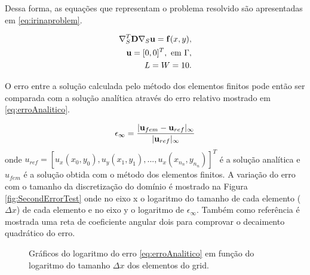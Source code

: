 Dessa forma, as equações que representam o problema resolvido são apresentadas em \eqref{eq:irinaproblem}. 

\begin{equation}\label{eq:irinaproblem}
    \begin{aligned}
        \nabla_S^T \mathbf{D} \nabla_S  \mathbf{u} = \mathbf{f}(x, y), \\
        \mathbf{u} = [0, 0]^T, \text{ em } \Gamma ,\\
        L = W = 10.
    \end{aligned}
\end{equation}

O erro entre a solução calculada pelo método dos elementos finitos pode então ser comparada
com a solução analítica através do erro relativo mostrado em \eqref{eq:erroAnalitico}.

\begin{equation} \label{eq:erroAnalitico}
    \epsilon_{\infty} =\frac{|\mathbf{u}_{fem} - \mathbf{u}_{ref}|_{\infty}}{|\mathbf{u}_{ref}|_{\infty}}
\end{equation}
onde $u_{ref} = [u_x(x_0, y_0), u_y(x_1, y_1), ..., u_x(x_{n_n}, y_{n_n})]^T$ é a solução analítica e $u_{fem}$ é a solução obtida com o método dos elementos finitos. A variação do erro com o tamanho da discretização do domínio é mostrado na Figura  \ref{fig:SecondErrorTest} onde no eixo x o logaritmo do tamanho de cada elemento ($\Delta x$) de cada elemento e no eixo y o logaritmo de $\epsilon_{\infty}$. Também como referência é mostrada uma reta de coeficiente angular dois para comprovar o decaimento quadrático do erro.


\begin{figure}[h]
\center
{}
\qquad
{}
\caption{Gráficos do logaritmo do erro \eqref{eq:erroAnalitico} em função do logaritmo do tamanho $\Delta x$ dos elementos do grid.}
\end{figure}
    
